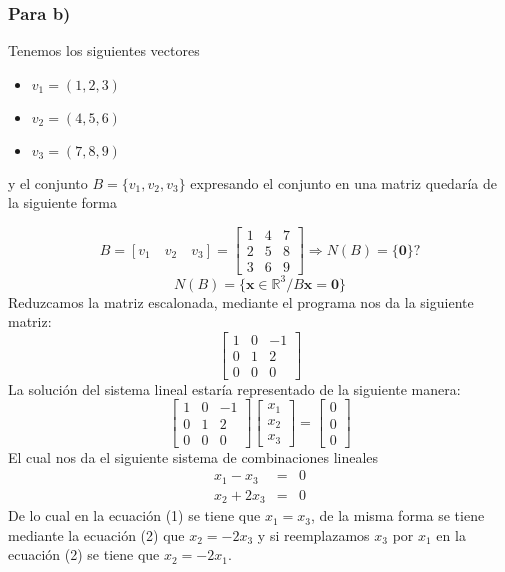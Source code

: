 \subsubsection{Para b)}
Tenemos los siguientes vectores
\begin{itemize}
    \item ${v}_{1} = (1,2,3)$
    \item ${v}_{2} = (4,5,6)$
    \item ${v}_{3} = (7,8,9)$ 
\end{itemize}
y el conjunto $B=\{ {v}_{1}, {v}_{2}, {v}_{3} \}$ expresando el conjunto en una matriz quedaría de la siguiente forma

\[
B = [ {v}_{1} \quad {v}_{2} \quad {v}_{3} ] =
\begin{bmatrix}
1 & 4 & 7 \\ 
2 & 5 & 8 \\
3 & 6 & 9
\end{bmatrix}
\Longrightarrow N(B) = \{ \mathbf{0} \} ?
\]
$$
N(B) = \{ \mathbf{x} \in \mathbb{R}^3 / B \mathbf{x} = \mathbf{0} \}
$$
Reduzcamos la matriz escalonada, mediante el programa nos da la siguiente matriz:
$$
\begin{bmatrix}
1 & 0 & -1 \\ 
0 & 1 & 2 \\
0 & 0 & 0
\end{bmatrix}
$$
La solución del sistema lineal estaría representado de la siguiente manera:
\[
\begin{bmatrix}
1 & 0 & -1 \\ 
0 & 1 & 2 \\
0 & 0 & 0
\end{bmatrix}
\begin{bmatrix}
{x}_{1} \\ 
{x}_{2} \\
{x}_{3}
\end{bmatrix} =
\begin{bmatrix}
0 \\ 
0 \\
0
\end{bmatrix}
\]
El cual nos da el siguiente sistema de combinaciones lineales
\setcounter{equation}{0}
\begin{eqnarray}
    {x}_{1} - {x}_{3} &=& 0 \\
    {x}_{2} + 2{x}_{3} &=& 0
\end{eqnarray}
De lo cual en la ecuación (1) se tiene que ${x}_{1} = {x}_{3}$, de la misma forma se tiene mediante la ecuación (2) que ${x}_{2} = -2{x}_{3}$ y si reemplazamos ${x}_{3}$ por ${x}_{1}$ en la ecuación (2) se tiene que ${x}_{2} = -2{x}_{1}$.\\

